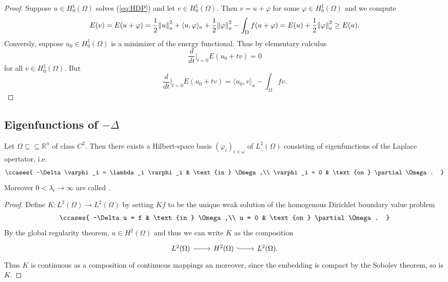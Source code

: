 \begin{proof}
	Suppose $u \in H^1_0(\Omega)$ solves (\ref{eq:HDP}) and let $v \in H^1_0(\Omega)$. Then $v = u + \varphi$ for some $\varphi \in H^1_0(\Omega)$ and we compute
	\begin{equation*}
		E(v) = E(u + \varphi) = \frac{1}{2}\norm{u}^2_a + \langle u,\varphi \rangle_a + \frac{1}{2}\norm{\varphi}^2_a - \int_\Omega f(u + \varphi) = E(u) + \frac{1}{2}\norm{\varphi}^2_a \geq E(u).
	\end{equation*}
	Conversly, suppose $u_0 \in H^1_0(\Omega)$ is a minimizer of the energy functional. Thus by elementary calculus
	\begin{equation*}
		\frac{d}{dt}\bigg\vert_{t = 0} E(u_0 + tv) = 0
	\end{equation*}
	\noindent for all $v \in H^1_0(\Omega)$. But
	\begin{equation*}
		\frac{d}{dt}\bigg\vert_{t = 0} E(u_0 + tv) = \langle u_0, v \rangle_a - \int_\Omega f v.
	\end{equation*}
\end{proof}

\subsection*{Eigenfunctions of $-\Delta$}

\begin{theorem}
	Let $\Omega \subseteq \subseteq \mathbb{R}^n$ of class $C^2$. Then there exists a Hilbert-space basis $(\varphi_i)_{i \in \omega}$ of $L^2(\Omega)$ consisting of eigenfunctions of the Laplace opertator, i.e. 
	\begin{align*}
		\ccases{
			-\Delta \varphi_i = \lambda_i \varphi_i & \text{in } \Omega,\\
			\varphi_i = 0 & \text{on } \partial \Omega.
		}
	\end{align*}
	Moreover $0 < \lambda_i \to \infty$ are called .
\end{theorem}

\begin{proof}
	Define $K : L^2(\Omega) \to L^2(\Omega)$ by setting $Kf$ to be the unique weak solution of the homogenous Dirichlet boundary value problem
	\begin{align*}
		\ccases{
			-\Delta u = f & \text{in } \Omega,\\
			u = 0 & \text{on } \partial \Omega.
		}
	\end{align*}
	By the global regularity theorem, $u \in H^2(\Omega)$ and thus we can write $K$ as the composition
	\begin{equation*}
		\begin{tikzcd}
			L^2(\Omega) \arrow[r] & H^2(\Omega) \arrow[r,hook] & L^2(\Omega).
		\end{tikzcd}
	\end{equation*}
	Thus $K$ is continuous as a composition of continuous mappings an moreover, since the embedding is compact by the Sobolev theorem, so is $K$.
\end{proof}
